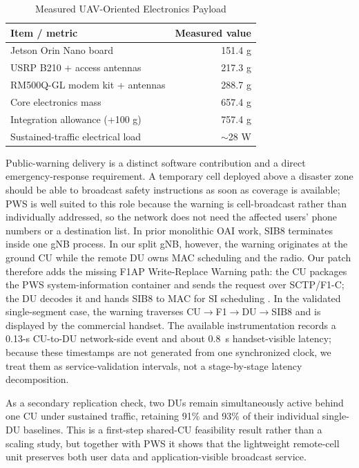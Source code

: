 \documentclass[conference]{IEEEtran}
\begin{document}
\begin{table}[t]
\caption{Measured UAV-Oriented Electronics Payload}
\label{tab:payload}
\centering\scriptsize
\begin{tabularx}{\columnwidth}{@{}Xr@{}}
\toprule
\textbf{Item / metric} & \textbf{Measured value}\\
\midrule
Jetson Orin Nano board & 151.4 g\\
USRP B210 + access antennas & 217.3 g\\
RM500Q-GL modem kit + antennas & 288.7 g\\
\midrule
Core electronics mass & 657.4 g\\
Integration allowance (+100 g) & 757.4 g\\
Sustained-traffic electrical load & $\sim$28 W\\
\bottomrule
\end{tabularx}
\end{table}

Public-warning delivery is a distinct software contribution and a direct
emergency-response requirement. A temporary cell deployed above a disaster
zone should be able to broadcast safety instructions as soon as coverage is
available; PWS is well suited to this role because the warning is cell-broadcast
rather than individually addressed, so the network does not need the affected
users' phone numbers or a destination list. In prior monolithic OAI work, SIB8
terminates inside one gNB process. In our split gNB, however, the warning
originates at the ground CU while the remote DU owns MAC scheduling and the
radio. Our patch therefore adds the missing F1AP Write-Replace Warning path:
the CU packages the PWS system-information container and sends the request over
SCTP/F1-C; the DU decodes it and hands SIB8 to MAC for SI scheduling
\cite{pwspatch}. In the validated single-segment case, the warning traverses
CU$\rightarrow$F1$\rightarrow$DU$\rightarrow$SIB8 and is displayed by the
commercial handset. The available instrumentation records a 0.13-s CU-to-DU
network-side event and about 0.8~s handset-visible latency; because these
timestamps are not generated from one synchronized clock, we treat them as
service-validation intervals, not a stage-by-stage latency decomposition.

As a secondary replication check, two DUs remain simultaneously active behind
one CU under sustained traffic, retaining 91\% and 93\% of their individual
single-DU baselines. This is a first-step shared-CU feasibility result rather
than a scaling study, but together with PWS it shows that the lightweight
remote-cell unit preserves both user data and application-visible broadcast
service.
\end{document}

